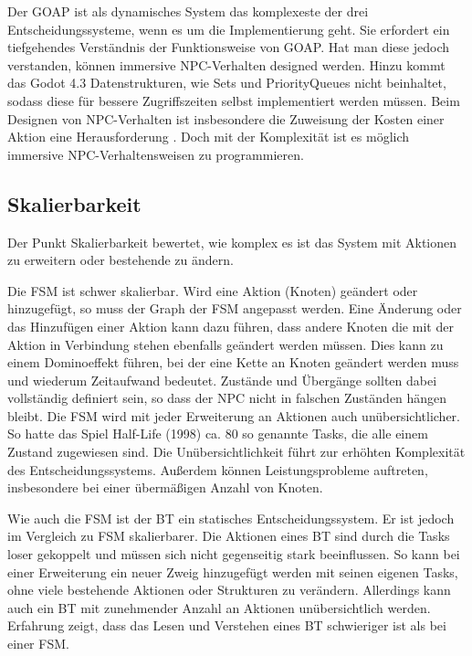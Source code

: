 Der GOAP ist als dynamisches System das komplexeste der drei Entscheidungssysteme, wenn es um die Implementierung geht. Sie erfordert ein tiefgehendes Verst\"{a}ndnis der Funktionsweise von GOAP. Hat man diese jedoch verstanden, k\"{o}nnen immersive NPC-Verhalten designed werden. Hinzu kommt das Godot 4.3 Datenstrukturen, wie Sets und PriorityQueues nicht beinhaltet, sodass diese f\"{u}r bessere Zugriffszeiten selbst implementiert werden m\"{u}ssen. Beim Designen von NPC-Verhalten ist insbesondere die Zuweisung der Kosten einer Aktion eine Herausforderung \autocite{Schwab2021}. Doch mit der Komplexit\"{a}t ist es m\"{o}glich immersive NPC-Verhaltensweisen zu programmieren.


\subsection{Skalierbarkeit}
\label{chap:skalierbarkeit}

Der Punkt Skalierbarkeit bewertet, wie komplex es ist das System mit Aktionen zu erweitern oder bestehende zu \"{a}ndern.

Die FSM ist schwer skalierbar. Wird eine Aktion (Knoten) ge\"{a}ndert oder hinzugef\"{u}gt, so muss der Graph der FSM angepasst werden. Eine \"{A}nderung oder das Hinzuf\"{u}gen einer Aktion kann dazu f\"{u}hren, dass andere Knoten die mit der Aktion in Verbindung stehen ebenfalls ge\"{a}ndert werden m\"{u}ssen. Dies kann zu einem Dominoeffekt f\"{u}hren, bei der eine Kette an Knoten ge\"{a}ndert werden muss und wiederum Zeitaufwand bedeutet. Zust\"{a}nde und \"{U}berg\"{a}nge sollten dabei vollst\"{a}ndig definiert sein, so dass der NPC nicht in falschen Zust\"{a}nden h\"{a}ngen bleibt. Die FSM wird mit jeder Erweiterung an Aktionen auch un\"{u}bersichtlicher. So hatte das Spiel Half-Life (1998) ca. 80 so genannte Tasks, die alle einem Zustand zugewiesen sind. Die Un\"{u}bersichtlichkeit f\"{u}hrt zur erh\"{o}hten Komplexit\"{a}t des Entscheidungssystems. Au\ss{}erdem k\"{o}nnen Leistungsprobleme auftreten, insbesondere bei einer \"{u}berm\"{a}\ss{}igen Anzahl von Knoten. \autocite{U2023}

Wie auch die FSM ist der BT ein statisches Entscheidungssystem. Er ist jedoch im Vergleich zu FSM skalierbarer. Die Aktionen eines BT sind durch die Tasks loser gekoppelt und m\"{u}ssen sich nicht gegenseitig stark beeinflussen. So kann bei einer Erweiterung ein neuer Zweig hinzugef\"{u}gt werden mit seinen eigenen Tasks, ohne viele bestehende Aktionen oder Strukturen zu ver\"{a}ndern.\autocite{aiag} Allerdings kann auch ein BT mit zunehmender Anzahl an Aktionen un\"{u}bersichtlich werden. Erfahrung zeigt, dass das Lesen und Verstehen eines BT schwieriger ist als bei einer FSM.


